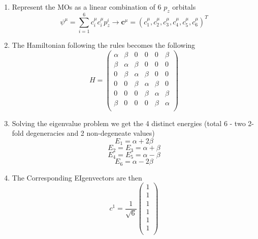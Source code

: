 \begin{enumerate}
    \item Represent the MOs as a linear combination of 6 $p_{z}$ orbitals
    \begin{equation}
        \psi^{\mu} = \sum_{i=1}^{6} c_{i}^{\mu} c_{i}^{\mu}p_{z}^{i} \rightarrow \textbf{c}^{\mu} = (c_{1}^{\mu}, c_{2}^{\mu}, c_{3}^{\mu}, c_{4}^{\mu}, c_{5}^{\mu}, c_{6}^{\mu})^{T}
    \end{equation}
    \item The Hamiltonian following the rules becomes the following
    \begin{equation}
         H = 
        \begin{pmatrix}
        \alpha & \beta & 0 & 0 & 0 & \beta \\
        \beta & \alpha & \beta & 0 & 0 & 0 \\
        0 & \beta & \alpha & \beta & 0 & 0 \\
        0 & 0 & \beta & \alpha & \beta & 0 \\
        0 & 0 & 0 & \beta & \alpha & \beta \\
        \beta & 0 & 0 & 0 & \beta & \alpha \\
        \end{pmatrix}
    \end{equation}
    \item Solving the eigenvalue problem we get the 4 distinct energies (total 6 - two 2-fold degeneracies and 2 non-degeneate values)
    \begin{equation}
        E_{1} = \alpha + 2\beta
    \end{equation}
    \begin{equation}
        E_{2} = E_{3} = \alpha + \beta
    \end{equation}
    \begin{equation}
        E_{4} = E_{5} = \alpha - \beta
    \end{equation}
    \begin{equation}
        E_{6} = \alpha - 2\beta
    \end{equation}
    \item The Corresponding EIgenvectors are then
    \begin{equation}
    c^{1}= \frac{1}{\sqrt{6}}
        \begin{pmatrix} 1 \\ 1 \\ 1 \\ 1 \\ 1 \\ 1 \\ \end{pmatrix}

\end{equation}
\end{enumerate}

